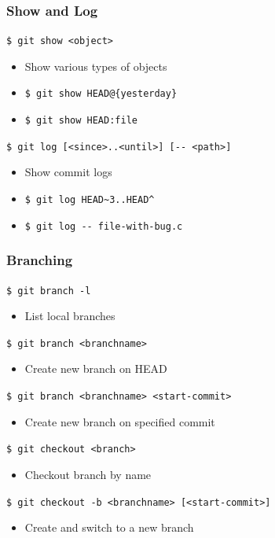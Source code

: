 \documentclass[english,compress]{beamer}
\begin{document}
\begin{frame}[fragile]
    \frametitle{Show and Log}

    \verb|$ git show <object>|
    \begin{itemize}
        \item Show various types of objects
        \item \verb|$ git show HEAD@{yesterday}|
        \item \verb|$ git show HEAD:file|
    \end{itemize}

    \verb|$ git log [<since>..<until>] [-- <path>]|
    \begin{itemize}
        \item Show commit logs
        \item \verb|$ git log HEAD~3..HEAD^|
        \item \verb|$ git log -- file-with-bug.c|
    \end{itemize}
\end{frame}

\begin{frame}[fragile]
    \frametitle{Branching}

    \verb|$ git branch -l|
    \begin{itemize}
        \item List local branches
    \end{itemize}

    \verb|$ git branch <branchname> |
    \begin{itemize}
        \item Create new branch on HEAD
    \end{itemize}

    \verb|$ git branch <branchname> <start-commit>|
    \begin{itemize}
        \item Create new branch on specified commit
    \end{itemize}

    \verb|$ git checkout <branch>|
    \begin{itemize}
        \item Checkout branch by name
    \end{itemize}

    \verb|$ git checkout -b <branchname> [<start-commit>]|
    \begin{itemize}
        \item Create and switch to a new branch
    \end{itemize}
\end{frame}
\end{document}
